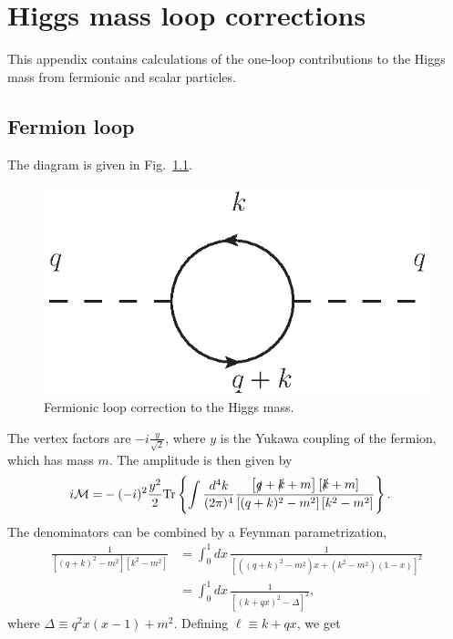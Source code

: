 \documentclass[twoside,english]{uiofysmaster}
\begin{document}
\chapter{Higgs mass loop corrections}
\label{appendix:higgs_mass_loop_correction}
This appendix contains calculations of the one-loop contributions to the Higgs mass from fermionic and scalar particles.

\section{Fermion loop}
The diagram is given in Fig.\ \ref{fig:appendix_higgs_top_loop}.
\begin{figure}[hbt]
\centering
\includegraphics[scale=1]{figures/appendix/higgs_top_loop_with_momenta.eps}
\caption{Fermionic loop correction to the Higgs mass.}
\label{fig:appendix_higgs_top_loop}
\end{figure}
The vertex factors are $-i\frac{y}{\sqrt{2}}$, where $y$ is the Yukawa coupling of the fermion, which has mass $m$. The amplitude is then given by
\begin{align}
	i\mathcal{M} =& -(-i)^2\frac{y^2}{2} \mathrm{Tr}\left\{ \int \frac{d^4 k}{(2\pi)^4} \frac{\left[ \slashed q + \slashed k + m \right]\left[ \slashed k + m \right]}{\left[(q+k)^2 - m^2 \right] \left[ k^2 - m^2 \right]}  \right\}.
\end{align}
The denominators can be combined by a Feynman parametrization,
\begin{align}
	\frac{1}{\left[(q+k)^2 - m^2 \right] \left[ k^2 - m^2 \right]} &= \int_0^1 dx\, \frac{1}{\left[\left( (q+k)^2 - m^2\right) x + \left(k^2 -m^2 \right)(1-x)\right]^2}\nonumber \\
	&= \int_0^1 dx \, \frac{1}{\left[(k+qx)^2 - \Delta\right]^2},
\end{align}
where $\Delta \equiv q^2x(x-1)+m^2$. Defining $\ell \equiv k+qx$, we get
\end{document}
